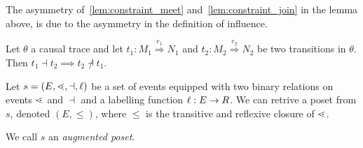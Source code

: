 \begin{remark}
  The asymmetry of~\autoref{lem:constraint_meet} and~\autoref{lem:constraint_join} in the lemma above, is due to the asymmetry in the definition of influence.
\end{remark}


\begin{lemma}
  \label{lem:inhibiting_pair}
  Let $\theta$ a causal trace and let $t_1:M_1\overset{e_1}{\Rightarrow}N_1$ and $t_2:M_2\overset{e_2}{\Rightarrow}N_2$ be two transitions in $\theta$. Then $t_1\dashv t_2\implies t_2\not\dashv t_1$.
\end{lemma}


\begin{definition}
  Let $s=(E, \lessdot,\dashv,\ell)$ be a set of events equipped with two binary relations on events $\lessdot$ and $\dashv$ and a labelling function $\ell:E\to R$. We can retrive a poset from $s$, denoted $(E,\leq)$, where $\leq$ is the transitive and reflexive closure of $\lessdot$.

We call $s$ an \emph{augmented poset}.
\end{definition}


